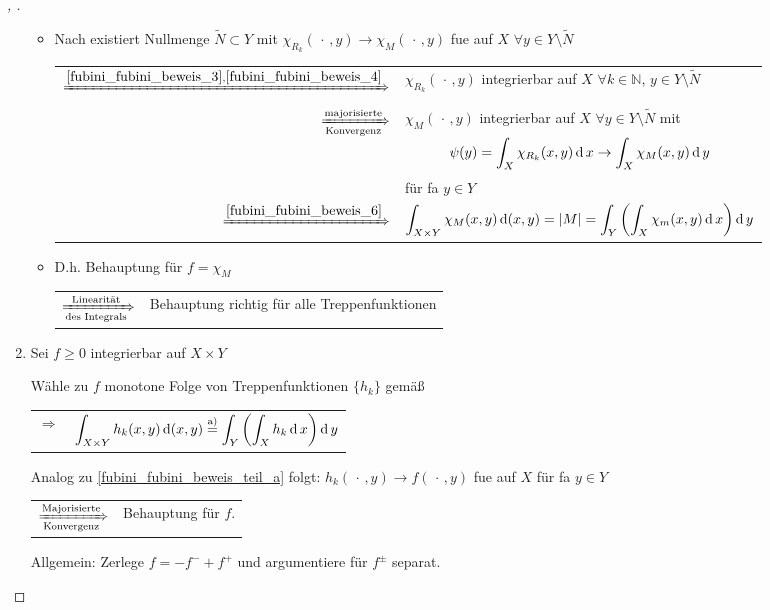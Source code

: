 \begin{proof}[, ]
\begin{enumerate}[label={\alph*)},topsep=\dimexpr-\baselineskip/2\relax]
\begin{itemize}
		\item Nach  existiert Nullmenge $\tilde{N}\subset Y$ mit $\chi_{R_k}(\,\cdot\, , y)\to \chi_M(\,\cdot \, , y)$ \gls{fue} auf $X$ $\forall y\in Y\setminus\tilde{N}$ \\
		\begin{tabularx}{\linewidth}{r@{\ \ }X}
		$\xRightarrow{\eqref{fubini_fubini_beweis_3},\eqref{fubini_fubini_beweis_4}}$ & $\chi_{R_k} (\,\cdot\, , y)$ integrierbar auf $X$ $\forall k\in \mathbb{N}$, $y\in Y\setminus\tilde{N}$ \\
		$\xRightarrow[\text{Konvergenz}]{\text{majorisierte}}$ & $\chi_M(\,\cdot\, ,y)$ integrierbar auf $X$ $\forall y\in Y\setminus\tilde{N}$ mit
		\[\psi(y) = \int_X \chi_{R_k}(x,y)\operatorname{d} x \to \int_X \chi_M (x,y) \operatorname{d} y\] für \gls{fa} $y\in Y$ \\
		$\xRightarrow{\eqref{fubini_fubini_beweis_6}}$&  $\displaystyle \int_{X\times Y} \chi_M (x,y) \operatorname{d} (x,y) = \vert M \vert = \int_Y \left( \int_X \chi_m (x,y) \operatorname{d} x\right) \operatorname{d} y$
		\end{tabularx}
		
		\item D.h. Behauptung für $f=\chi_M$ \\ \begin{tabularx}{\linewidth}{r@{\ \ }X}
		$\xRightarrow[\text{des Integrals}]{\text{Linearität}}$ & Behauptung richtig für alle Treppenfunktionen
		\end{tabularx}
		\end{itemize}
		\item Sei $f\ge 0$ integrierbar auf $X\times Y$
		
		Wähle zu $f$ monotone Folge von Treppenfunktionen $\{ h_k\}$ gemäß  \\ \begin{tabularx}{\linewidth}{r@{\ \ }X}
		$\Rightarrow$ & $\displaystyle \int_{X\times Y} h_k(x,y) \operatorname{d} (x,y) \overset{\text{a)}}{=} \int_Y \left( \int_X h_k \operatorname{d} x\right) \operatorname{d} y$
		\end{tabularx}
		
		Analog zu \ref{fubini_fubini_beweis_teil_a} folgt: $h_k(\,\cdot\, , y)\to f(\,\cdot\,,y)$ \gls{fue} auf $X$ für \gls{fa} $y\in Y$ \\ \begin{tabularx}{\linewidth}{r@{\ \ }X}
		$\xRightarrow[\text{Konvergenz}]{\text{Majorisierte}}$ & Behauptung für $f$.
		\end{tabularx}
		
		Allgemein: Zerlege $f = -f^- + f^+$ und argumentiere für $f^\pm$ separat.
	\end{enumerate}
\end{proof}

